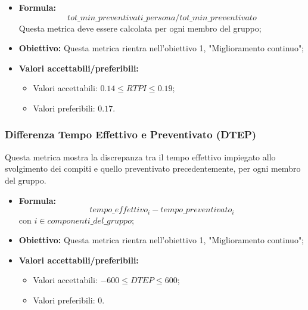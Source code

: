 \begin{itemize}
	\item \textbf{Formula:}\[tot\_min\_preventivati\_persona / tot\_min\_preventivato\]
	Questa metrica deve essere calcolata per ogni membro del gruppo;
	\item \textbf{Obiettivo:} Questa metrica rientra nell'obiettivo 1, "Miglioramento continuo";
	\item \textbf{Valori accettabili/preferibili: }
	\begin{itemize}
		\item Valori accettabili: $0.14 \leq RTPI \leq 0.19$;
		\item Valori preferibili: $0.17$.
	\end{itemize}
\end{itemize}

\subsubsection{Differenza Tempo Effettivo e Preventivato (DTEP)}
Questa metrica mostra la discrepanza tra il tempo effettivo impiegato allo svolgimento dei compiti e quello preventivato precedentemente, per ogni membro del gruppo.
\begin{itemize}
	\item \textbf{Formula:}\[tempo\_effettivo_i - tempo\_preventivato_i\]
	con $i \in {componenti\_del\_gruppo}$;
	\item \textbf{Obiettivo:} Questa metrica rientra nell'obiettivo 1, "Miglioramento continuo";
	\item \textbf{Valori accettabili/preferibili: }
	\begin{itemize}
		\item Valori accettabili: $-600 \leq DTEP \leq 600$;
		\item Valori preferibili: $0$.
	\end{itemize}
\end{itemize}

